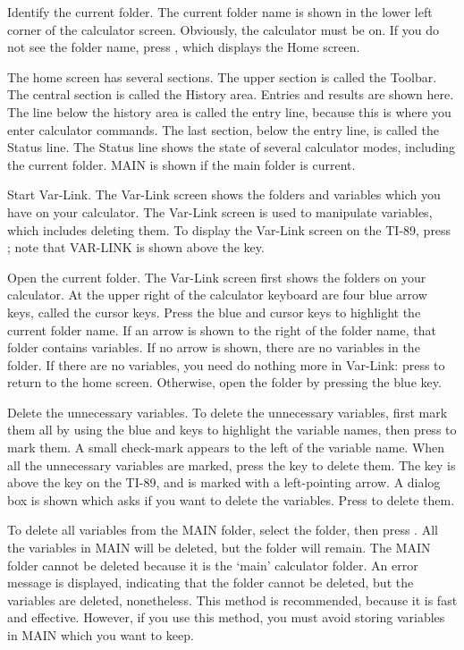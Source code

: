 Identify the current folder. The current folder name is shown in the
lower left corner of the calculator screen. Obviously, the
calculator must be on. If you do not see the folder name, press
, which displays the Home screen.

The home screen has several sections. The upper section is called
the Toolbar. The central section is called the History area. Entries
and results are shown here. The line below the history area is
called the entry line, because this is where you enter calculator
commands. The last section, below the entry line, is called the
Status line. The Status line shows the state of several calculator
modes, including the current folder. MAIN is shown if the main
folder is current.

Start Var-Link. The Var-Link screen shows the folders and variables
which you have on your calculator. The Var-Link screen is used to
manipulate variables, which includes deleting them. To display the
Var-Link screen on the TI-89, press  \key{$-$}; note that
VAR-LINK is shown above the \key{$-$} key.

Open the current folder. The Var-Link screen first shows the folders
on your calculator. At the upper right of the calculator keyboard
are four blue arrow keys, called the cursor keys. Press the blue
 and  cursor keys to highlight the current folder
name. If an arrow is shown to the right of the folder name, that
folder contains variables. If no arrow is shown, there are no
variables in the folder. If there are no variables, you need do
nothing more in Var-Link: press  to return to the home
screen. Otherwise, open the folder by pressing the blue 
key.

Delete the unnecessary variables. To delete the unnecessary
variables, first mark them all by using the blue  and
 keys to highlight the variable names, then press 
to mark them. A small check-mark appears to the left of the variable
name. When all the unnecessary variables are marked, press the
 key to delete them. The  key is above
the  key on the TI-89, and is marked with a left-pointing
arrow. A dialog box is shown which asks if you want to delete the
variables. Press  to delete them.

To delete all variables from the MAIN folder, select the folder,
then press . All the variables in MAIN will be
deleted, but the folder will remain. The MAIN folder cannot be
deleted because it is the `main' calculator folder. An error message
is displayed, indicating that the folder cannot be deleted, but the
variables are deleted, nonetheless. This method is recommended,
because it is fast and effective. However, if you use this method,
you must avoid storing variables in MAIN which you want to keep.

